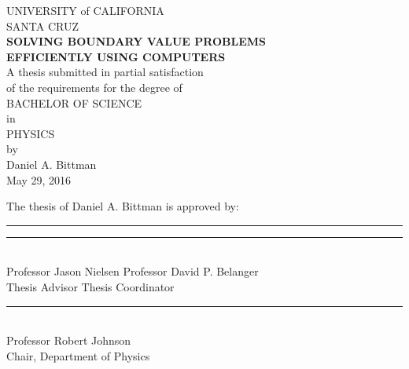 \documentclass[12pt]{article}
\begin{document}
\begin{center}

	UNIVERSITY of CALIFORNIA\\
	\vspace{2mm}
	SANTA CRUZ\\
	\vspace{10mm}
	{\large\textbf{\textsc{SOLVING BOUNDARY VALUE PROBLEMS\\EFFICIENTLY USING COMPUTERS}}}\\
	\vspace{10mm}
	A thesis submitted in partial satisfaction\\of the requirements for the degree of\\
	\vspace{5mm}
	\textsc{BACHELOR OF SCIENCE}\\
	\vspace{3mm}
	in\\
	\vspace{3mm}
	\textsc{PHYSICS}\\
	\vspace{5mm}
	by\\
	\vspace{2mm}
	Daniel A. Bittman\\
	May 29, 2016\\

	\vspace{2in}

	The thesis of Daniel A. Bittman is approved by:\\
	\vspace{1in}

	\rule{2.5in}{2pt}\hfill
	\rule{2.5in}{2pt} \\
	Professor Jason Nielsen \hfill Professor David P. Belanger\\
	Thesis Advisor \hfill Thesis Coordinator\\

	\vspace{15mm}
	\rule{2.5in}{2pt}\\
	Professor Robert Johnson\\
	Chair, Department of Physics

\end{center}

\clearpage
\setcounter{page}{1}
\renewcommand{\thepage}{\roman{page}}
\end{document}
